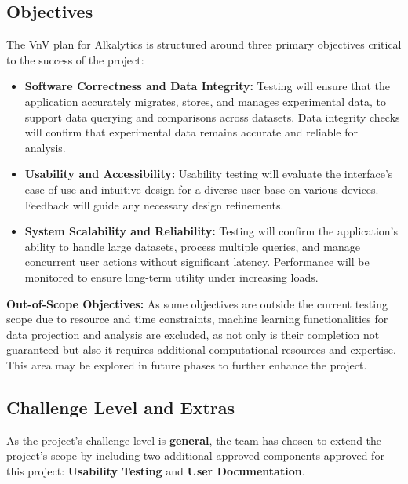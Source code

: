 \documentclass[12pt, titlepage]{article}
\begin{document}
\subsection{Objectives}

The VnV plan for Alkalytics is structured around three primary objectives
critical to the success of the project:

\begin{itemize}
  \item \textbf{Software Correctness and Data Integrity:} Testing will ensure
  that the application accurately migrates, stores, and manages experimental
  data, to support data querying and comparisons across datasets. Data integrity
  checks will confirm that experimental data remains accurate and reliable for
  analysis.

  \item \textbf{Usability and Accessibility:} Usability testing will evaluate
  the interface’s ease of use and intuitive design for a diverse user base on
  various devices. Feedback will guide any necessary design refinements.
  
  \item \textbf{System Scalability and Reliability:} Testing will confirm the
  application's ability to handle large datasets, process multiple queries, and
  manage concurrent user actions without significant latency. Performance will
  be monitored to ensure long-term utility under increasing loads.
  
\end{itemize}

\noindent \textbf{Out-of-Scope Objectives:} As some objectives are outside the
current testing scope due to resource and time constraints, machine learning
functionalities for data projection and analysis are excluded, as not only is
their completion not guaranteed but also it requires additional computational
resources and expertise. This area may be explored in future phases to further
enhance the project.


\subsection{Challenge Level and Extras}

As the project's challenge level is \textbf{general}, the team has chosen to
extend the project’s scope by including two additional approved components
approved for this project: \textbf{Usability Testing} and \textbf{User
Documentation}.
\newline
\end{document}

